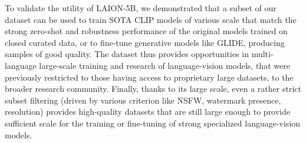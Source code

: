 To validate the utility of LAION-5B, we demonstrated that a subset of our dataset can be used to train SOTA CLIP models of various scale that match the strong zero-shot and robustness performance of the original models trained on closed curated data, or to fine-tune generative models like GLIDE, producing samples of good quality. The dataset thus provides opportunities in multi-language large-scale training and research of language-vision models, that were previously restricted to those having access to proprietary large datasets, to the broader research community. Finally, thanks to its large scale, even a rather strict subset filtering (driven by various criterion like NSFW, watermark presence, resolution) provides high-quality datasets that are still large enough to provide sufficient scale for the training or fine-tuning of strong specialized language-vision models. 



